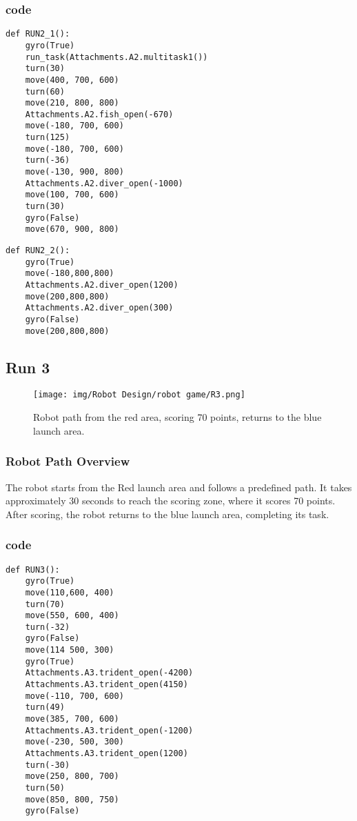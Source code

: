 \subsubsection{code}
\begin{lstlisting}
def RUN2_1():
    gyro(True)
    run_task(Attachments.A2.multitask1())
    turn(30)
    move(400, 700, 600)
    turn(60)
    move(210, 800, 800)
    Attachments.A2.fish_open(-670)
    move(-180, 700, 600)
    turn(125)
    move(-180, 700, 600)
    turn(-36)
    move(-130, 900, 800)
    Attachments.A2.diver_open(-1000)
    move(100, 700, 600)
    turn(30)
    gyro(False)
    move(670, 900, 800)
\end{lstlisting}
\begin{lstlisting}
def RUN2_2():
    gyro(True)
    move(-180,800,800)
    Attachments.A2.diver_open(1200)
    move(200,800,800)
    Attachments.A2.diver_open(300)
    gyro(False)
    move(200,800,800)
\end{lstlisting}





\newpage
\subsection{Run 3}
\begin{figure}[h]
    \centering
    \texttt{[image: img/Robot Design/robot game/R3.png]}
    \caption{Robot path from the red area, scoring 70 points, returns to the blue launch area.}
    \label{fig:robot_path}
\end{figure}
\subsubsection{Robot Path Overview}

The robot starts from the Red launch area and follows a predefined path. It takes approximately 30 seconds to reach the scoring zone, where it scores 70 points. After scoring, the robot returns to the blue launch area, completing its task.
\subsubsection{code}
\begin{lstlisting}
def RUN3():
    gyro(True)
    move(110,600, 400)
    turn(70)
    move(550, 600, 400)
    turn(-32)
    gyro(False)
    move(114 500, 300)
    gyro(True)
    Attachments.A3.trident_open(-4200)
    Attachments.A3.trident_open(4150)
    move(-110, 700, 600)
    turn(49)
    move(385, 700, 600)
    Attachments.A3.trident_open(-1200)
    move(-230, 500, 300)
    Attachments.A3.trident_open(1200)
    turn(-30)
    move(250, 800, 700)
    turn(50)
    move(850, 800, 750)
    gyro(False)
\end{lstlisting}






